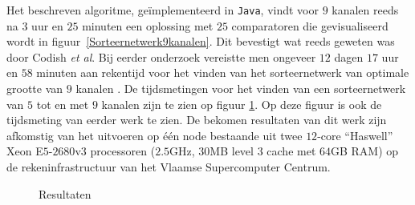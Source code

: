 \documentclass{article}
\begin{document}
Het beschreven algoritme, ge\"implementeerd in \texttt{Java}, vindt voor $9$ kanalen reeds na $3$ uur en $25$ minuten een oplossing met $25$ comparatoren die gevisualiseerd wordt in figuur~\ref{Sorteernetwerk9kanalen}.
Dit bevestigt wat reeds geweten was door Codish \textit{et al}. 
Bij eerder onderzoek vereistte men ongeveer $12$ dagen $17$ uur en $58$ minuten aan rekentijd voor het vinden van het sorteernetwerk van optimale grootte van $9$ kanalen \cite{sortingNetworksSize2014}.
De tijdsmetingen voor het vinden van een sorteernetwerk van $5$ tot en met $9$ kanalen zijn te zien op figuur \ref{Tijdsresultaten}. Op deze figuur is ook de tijdsmeting van eerder werk te zien.
De bekomen resultaten van dit werk zijn afkomstig van het uitvoeren op \'e\'en node bestaande uit twee $12$-core ``Haswell'' Xeon E$5$-$2680$v$3$ processoren ($2.5$GHz, $30$MB level $3$ cache met $64$GB RAM) op de rekeninfrastructuur van het Vlaamse Supercomputer Centrum.

\begin{figure}[!h]
\centering
{}
\caption{Resultaten}
\label{Tijdsresultaten}
\end{figure}
\end{document}
